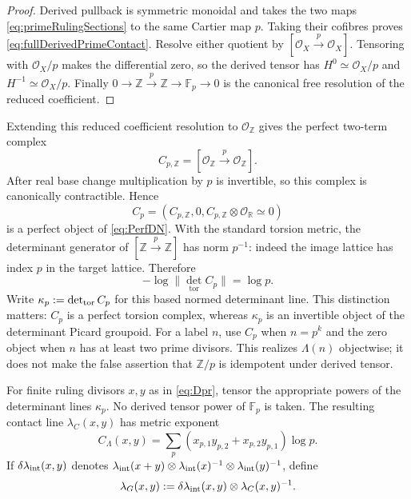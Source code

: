 \documentclass[11pt]{amsart}
\theoremstyle{definition}
\theoremstyle{remark}
\newcommand{\R}{\mathbb R}
\newcommand{\Z}{\mathbb Z}
\begin{document}
\begin{proof}
Derived pullback is symmetric monoidal and takes the two maps
\eqref{eq:primeRulingSections} to the same Cartier map $p$.  Taking their
cofibres proves \eqref{eq:fullDerivedPrimeContact}.  Resolve either quotient
by $[\mathcal O_X\xrightarrow p\mathcal O_X]$.  Tensoring with
$\mathcal O_X/p$ makes the differential zero, so the derived tensor has
$H^0\simeq\mathcal O_X/p$ and
$H^{-1}\simeq\mathcal O_X/p$.  Finally
$0\to\Z\xrightarrow p\Z\to\mathbb F_p\to0$ is the canonical free
resolution of the reduced coefficient.
\end{proof}

Extending this reduced coefficient resolution to $\mathcal O_{\Z}$ gives
the perfect two-term complex
\begin{equation}\label{eq:localcontact}
 C_{p,\Z}=[\mathcal O_{\Z}\xrightarrow{p}\mathcal O_{\Z}].
\end{equation}
After real base change multiplication by $p$ is invertible, so this complex
is canonically contractible.  Hence
\begin{equation}\label{eq:DNcontact}
 C_p=(C_{p,\Z},0,C_{p,\Z}\otimes\mathcal O_{\R}\simeq0)
\end{equation}
is a perfect object of \eqref{eq:PerfDN}.  With the standard torsion metric,
the determinant generator of $[\Z\xrightarrow p\Z]$ has norm $p^{-1}$:
indeed the image lattice has index $p$ in the target lattice.  Therefore
\begin{equation}\label{eq:contactmass}
 -\log\|\det_{\mathrm{tor}}C_p\|=\log p.
\end{equation}
Write $\kappa_p:=\det_{\rm tor}C_p$ for this based normed determinant
line.  This distinction matters: $C_p$ is a perfect torsion complex,
whereas $\kappa_p$ is an invertible object of the determinant Picard
groupoid.
For a label $n$, use $C_p$ when $n=p^k$ and the zero object when $n$ has at
least two prime divisors.  This realizes $\Lambda(n)$ objectwise; it does
not make the false assertion that $\Z/p$ is idempotent under derived tensor.

For finite ruling divisors $x,y$ as in \eqref{eq:Dpr}, tensor the appropriate
powers of the determinant lines $\kappa_p$.  No derived tensor power of
$\mathbb F_p$ is taken.  The resulting contact line
$\lambda_C(x,y)$ has metric exponent
\begin{equation}\label{eq:Clambda}
 C_\Lambda(x,y)=\sum_p
 (x_{p,1}y_{p,2}+x_{p,2}y_{p,1})\log p.
\end{equation}
If $\delta\lambda_{\rm int}(x,y)$ denotes
$\lambda_{\rm int}(x+y)\otimes
\lambda_{\rm int}(x)^{-1}\otimes
\lambda_{\rm int}(y)^{-1}$, define
\begin{equation}\label{eq:greenline}
 \lambda_G(x,y):=\delta\lambda_{\rm int}(x,y)
                  \otimes\lambda_C(x,y)^{-1}.
\end{equation}
\end{document}
